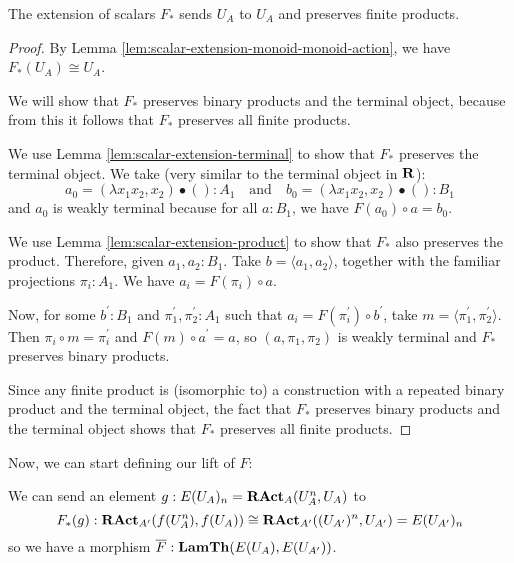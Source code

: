 \begin{lemma}
  The extension of scalars $ F_* $ sends $ U_A $ to $ U_A $ and preserves finite products.
\end{lemma}
\begin{proof}
  By Lemma \ref{lem:scalar-extension-monoid-monoid-action}, we have $ F_*(U_A) \cong U_A $.

  We will show that $ F_* $ preserves binary products and the terminal object, because from this it follows that $ F_* $ preserves all finite products.

  We use Lemma \ref{lem:scalar-extension-terminal} to show that $ F_* $ preserves the terminal object. We take (very similar to the terminal object in $ \mathbf{R} $):
  \[ a_0 = (\lambda x_1 x_2, x_2) \bullet () : A_1 \quad \text{and} \quad b_0 = (\lambda x_1 x_2, x_2) \bullet () : B_1 \]
  and $ a_0 $ is weakly terminal because for all $ a : B_1 $, we have $ F(a_0) \circ a = b_0 $.

  We use Lemma \ref{lem:scalar-extension-product} to show that $ F_* $ also preserves the product. Therefore, given $ a_1, a_2 : B_1 $. Take $ b = \langle a_1, a_2 \rangle $, together with the familiar projections $ \pi_i : A_1 $. We have $ a_i = F(\pi_i) \circ a $.

  Now, for some $ b^\prime: B_1 $ and $ \pi_1^\prime, \pi_2^\prime: A_1 $ such that $ a_i = F(\pi_i^\prime) \circ b^\prime $, take $ m = \langle \pi_1^\prime, \pi_2^\prime \rangle $. Then $ \pi_i \circ m = \pi_i^\prime $ and $ F(m) \circ a^\prime = a $, so $ (a, \pi_1, \pi_2) $ is weakly terminal and $ F_* $ preserves binary products.

  Since any finite product is (isomorphic to) a construction with a repeated binary product and the terminal object, the fact that $ F_* $ preserves binary products and the terminal object shows that $ F_* $ preserves all finite products.
\end{proof}

Now, we can start defining our lift of $ F $:
\begin{definition}
  We can send an element $ g: E(U_A)_n = \mathbf{RAct}_{A}(U_A^n, U_A) $ to
  \[ F_*(g): \mathbf{RAct}_{A^\prime}(f(U_A^n), f(U_A)) \cong \mathbf{RAct}_{A^\prime}((U_{A^\prime})^n, U_{A^\prime}) = E(U_{A^\prime})_n \]
  so we have a morphism $ \overline F: \mathbf{LamTh}(E(U_A), E(U_{A^\prime})) $.
\end{definition}

